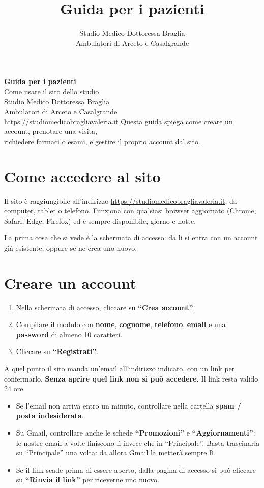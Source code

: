\documentclass[11pt,a4paper]{article}
\title{\color{studioteal}\Huge Guida per i pazienti}
\author{\Large Studio Medico Dottoressa Braglia \\[.3em] \normalsize Ambulatori di Arceto e Casalgrande}
\date{}
\newcommand{\bottone}[1]{\textbf{``#1''}}
\begin{document}
\begin{titlepage}
\centering
\vspace*{3cm}
{\color{studioteal}\Huge\bfseries Guida per i pazienti}\\[1em]
{\Large Come usare il sito dello studio}\\[2em]
{\large Studio Medico Dottoressa Braglia}\\
{\large Ambulatori di Arceto e Casalgrande}\\[3em]
{\normalsize\color{studiogrigio} \url{https://studiomedicobragliavaleria.it}}
\vfill
{\small\color{studiogrigio} Questa guida spiega come creare un account, prenotare una visita, \\
richiedere farmaci o esami, e gestire il proprio account dal sito.}
\end{titlepage}

\tableofcontents
\newpage

\section{Come accedere al sito}

Il sito è raggiungibile all'indirizzo \url{https://studiomedicobragliavaleria.it}, da computer, tablet o telefono. Funziona con qualsiasi browser aggiornato (Chrome, Safari, Edge, Firefox) ed è sempre disponibile, giorno e notte.

La prima cosa che si vede è la schermata di accesso: da lì si entra con un account già esistente, oppure se ne crea uno nuovo.

\section{Creare un account}

\begin{enumerate}
  \item Nella schermata di accesso, cliccare su \bottone{Crea account}.
  \item Compilare il modulo con \textbf{nome}, \textbf{cognome}, \textbf{telefono}, \textbf{email} e una \textbf{password} di almeno 10 caratteri.
  \item Cliccare su \bottone{Registrati}.
\end{enumerate}

A quel punto il sito manda un'email all'indirizzo indicato, con un link per confermarlo. \textbf{Senza aprire quel link non si può accedere.} Il link resta valido 24 ore.

\begin{itemize}
  \item Se l'email non arriva entro un minuto, controllare nella cartella \textbf{spam / posta indesiderata}.
  \item Su Gmail, controllare anche le schede \textbf{``Promozioni''} e \textbf{``Aggiornamenti''}: le nostre email a volte finiscono lì invece che in ``Principale''. Basta trascinarla su ``Principale'' una volta: da allora Gmail la metterà sempre lì.
  \item Se il link scade prima di essere aperto, dalla pagina di accesso si può cliccare su \bottone{Rinvia il link} per riceverne uno nuovo.
\end{itemize}
\end{document}
